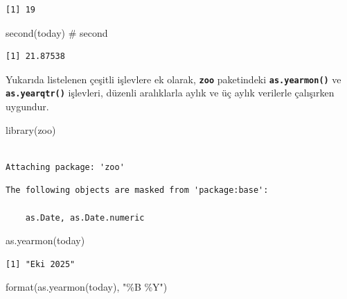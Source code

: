 \documentclass[
  letterpaper,
  DIV=11,
  numbers=noendperiod]{scrreprt}
\newenvironment{Shaded}{\begin{snugshade}}{\end{snugshade}}
\newcommand{\CommentTok}[1]{\textcolor[rgb]{0.37,0.37,0.37}{#1}}
\newcommand{\FunctionTok}[1]{\textcolor[rgb]{0.28,0.35,0.67}{#1}}
\newcommand{\NormalTok}[1]{\textcolor[rgb]{0.00,0.23,0.31}{#1}}
\newcommand{\StringTok}[1]{\textcolor[rgb]{0.13,0.47,0.30}{#1}}
\begin{document}
\begin{verbatim}
[1] 19
\end{verbatim}

\begin{Shaded}
\begin{Highlighting}[]
\FunctionTok{second}\NormalTok{(today) }\CommentTok{\# second}
\end{Highlighting}
\end{Shaded}

\begin{verbatim}
[1] 21.87538
\end{verbatim}

Yukarıda listelenen çeşitli işlevlere ek olarak, \textbf{\texttt{zoo}}
paketindeki \textbf{\texttt{as.yearmon()}} ve
\textbf{\texttt{as.yearqtr()}} işlevleri, düzenli aralıklarla aylık ve
üç aylık verilerle çalışırken uygundur.

\begin{Shaded}
\begin{Highlighting}[]
\FunctionTok{library}\NormalTok{(zoo)}
\end{Highlighting}
\end{Shaded}

\begin{verbatim}

Attaching package: 'zoo'
\end{verbatim}

\begin{verbatim}
The following objects are masked from 'package:base':

    as.Date, as.Date.numeric
\end{verbatim}

\begin{Shaded}
\begin{Highlighting}[]
\FunctionTok{as.yearmon}\NormalTok{(today)}
\end{Highlighting}
\end{Shaded}

\begin{verbatim}
[1] "Eki 2025"
\end{verbatim}

\begin{Shaded}
\begin{Highlighting}[]
\FunctionTok{format}\NormalTok{(}\FunctionTok{as.yearmon}\NormalTok{(today), }\StringTok{"\%B \%Y"}\NormalTok{)}
\end{Highlighting}
\end{Shaded}
\end{document}
